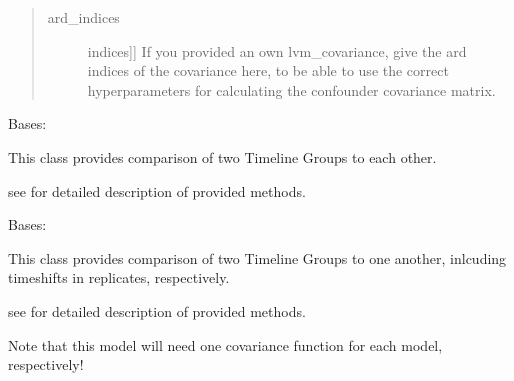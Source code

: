 \documentclass[letterpaper,10pt]{sphinxmanual}
\begin{document}
\begin{fulllineitems}
\begin{fulllineitems}
\begin{quote}
\begin{description}
\item[{ard\_indices}] \leavevmode{[}{[}indices{]}{]}
If you provided an own lvm\_covariance, give the ard indices of the covariance here,
to be able to use the correct hyperparameters for calculating the confounder covariance matrix.

\end{description}
\end{quote}

\end{fulllineitems}


\end{fulllineitems}


\begin{fulllineitems}
\label{base:gptwosample.twosample.twosample_base.TwoSampleShare}
Bases: {\hyperref[base:gptwosample.twosample.twosample_base.TwoSampleBase]{}}

This class provides comparison of two Timeline Groups to each other.

see {\hyperref[base:gptwosample.twosample.twosample_base.TwoSampleBase]{}} for detailed description of provided methods.

\end{fulllineitems}


\begin{fulllineitems}
\label{base:gptwosample.twosample.twosample_base.TwoSampleSeparate}
Bases: {\hyperref[base:gptwosample.twosample.twosample_base.TwoSampleBase]{}}

This class provides comparison of two Timeline Groups to one another, inlcuding timeshifts in replicates, respectively.

see {\hyperref[base:gptwosample.twosample.twosample_base.TwoSampleBase]{}} for detailed description of provided methods.

Note that this model will need one covariance function for each model, respectively!

\end{fulllineitems}
\end{document}
